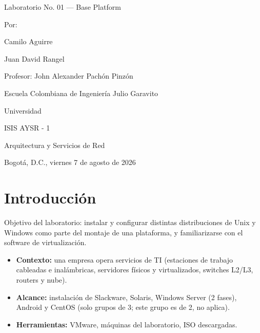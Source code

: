 \documentclass[11pt,a4paper]{report}
\begin{document}
\sloppy

\begin{titlepage}
  \centering
  \vspace*{1cm}


  {\large Laboratorio No. 01 --- Base Platform \par}
  \vspace{1.5cm}

  {\large Por: \par}
  {\large Camilo Aguirre \par}
  {\large Juan David Rangel \par}
  \vspace{1cm}

  {\large Profesor: John Alexander Pachón Pinzón \par}
  \vspace{1.5cm}

  {\large Escuela Colombiana de Ingeniería Julio Garavito \par}
  {\large Universidad \par}
  \vspace{0.5cm}

  {\large ISIS AYSR - 1 \par}
  {\large Arquitectura y Servicios de Red \par}
  \vspace{1.5cm}

  {\large Bogotá, D.C., viernes 7 de agosto de 2026 \par}

  \vfill
\end{titlepage}

\tableofcontents
\newpage

\section{Introducción}

Objetivo del laboratorio: instalar y configurar distintas distribuciones de Unix y Windows como parte del montaje de una plataforma, y familiarizarse con el software de virtualización.

\begin{itemize}
  \item \textbf{Contexto:} una empresa opera servicios de TI (estaciones de trabajo cableadas e inalámbricas, servidores físicos y virtualizados, switches L2/L3, routers y nube).
  \item \textbf{Alcance:} instalación de Slackware, Solaris, Windows Server (2 fases), Android y CentOS (solo grupos de 3; este grupo es de 2, no aplica).
  \item \textbf{Herramientas:} VMware, máquinas del laboratorio, ISO descargadas.
\end{itemize}
\end{document}

